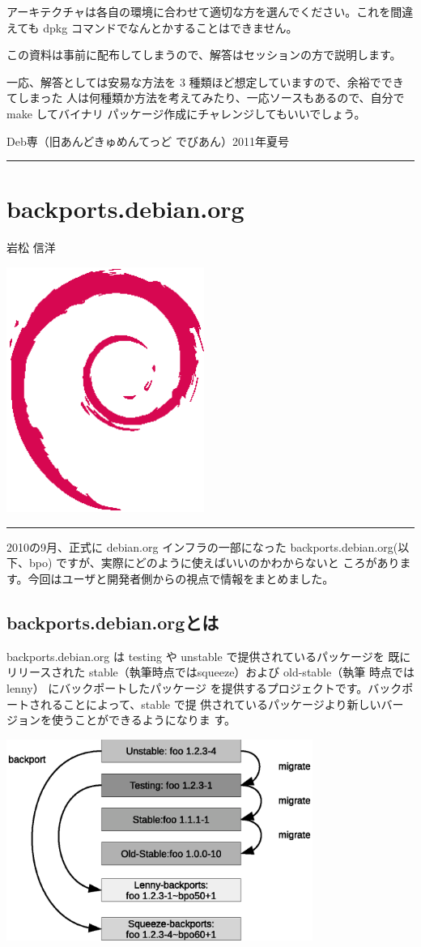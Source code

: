 \documentclass[mingoth,a4paper]{jsarticle}
\renewcommand{\dancersection}[2]{%
\newpage
Deb専（旧あんどきゅめんてっど でびあん）2011年夏号
%
\vspace{0.1mm}\\
{\color{dancerdarkblue}\rule{\hsize}{2mm}}

%
%
\begin{minipage}[t]{0.6\hsize}
\color{dancerdarkblue}
\vspace{1cm}
\section{#1}
\hfill{}#2\\
\end{minipage}
\begin{minipage}[t]{0.4\hsize}
\vspace{-2cm}
\hfill{}\includegraphics[height=8cm]{image200502/openlogo-nd.eps}\\
\vspace{-5cm}
\end{minipage}
%
{\color{dancerlightblue}\rule{0.66\hsize}{2mm}}
%
\vspace{2cm}
}
\begin{document}
アーキテクチャは各自の環境に合わせて適切な方を選んでください。これを間違えても
dpkg コマンドでなんとかすることはできません。

この資料は事前に配布してしまうので、解答はセッションの方で説明します。

一応、解答としては安易な方法を 3 種類ほど想定していますので、余裕でできてしまった
人は何種類か方法を考えてみたり、一応ソースもあるので、自分で make してバイナリ
パッケージ作成にチャレンジしてもいいでしょう。

\dancersection{backports.debian.org}{岩松 信洋}

2010の9月、正式に debian.org インフラの一部になった
backports.debian.org(以下、bpo) ですが、実際にどのように使えばいいのかわからないと
ころがあります。今回はユーザと開発者側からの視点で情報をまとめました。

\subsection{backports.debian.orgとは}

backports.debian.org は
testing や unstable で提供されているパッケージを
既にリリースされた stable（執筆時点ではsqueeze）および old-stable（執筆
時点ではlenny） にバックポートしたパッケージ
を提供するプロジェクトです。バックポートされることによって、stable で提
供されているパッケージより新しいバージョンを使うことができるようになりま
す。

\begin{center}
\includegraphics[width=10cm]{image201104/backports-image_mono.eps}
\end{center}


\end{document}
